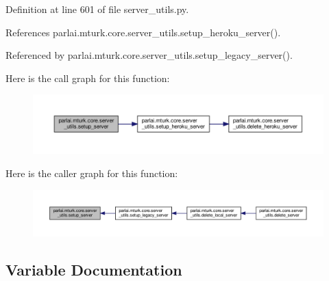 Definition at line 601 of file server\+\_\+utils.\+py.



References parlai.\+mturk.\+core.\+server\+\_\+utils.\+setup\+\_\+heroku\+\_\+server().



Referenced by parlai.\+mturk.\+core.\+server\+\_\+utils.\+setup\+\_\+legacy\+\_\+server().

Here is the call graph for this function\+:
\nopagebreak
\begin{figure}[H]
\begin{center}
\leavevmode
\includegraphics[width=350pt]{namespaceparlai_1_1mturk_1_1core_1_1server__utils_a154e8cbb18375ff8fd6730154d312bbc_cgraph}
\end{center}
\end{figure}
Here is the caller graph for this function\+:
\nopagebreak
\begin{figure}[H]
\begin{center}
\leavevmode
\includegraphics[width=350pt]{namespaceparlai_1_1mturk_1_1core_1_1server__utils_a154e8cbb18375ff8fd6730154d312bbc_icgraph}
\end{center}
\end{figure}


\subsection{Variable Documentation}
\mbox{\label{namespaceparlai_1_1mturk_1_1core_1_1server__utils_a8cb98cb11ecd7bf3367ee1bc905816d6}} 
